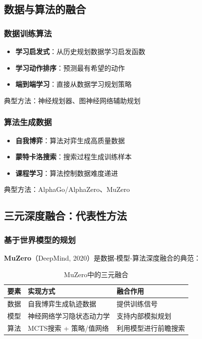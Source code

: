 \documentclass[12pt,a4paper]{ctexart}
\begin{document}
\subsection{数据与算法的融合}

\subsubsection{数据训练算法}

\begin{fusionbox}
\begin{itemize}
    \item \textbf{学习启发式}：从历史规划数据学习启发函数
    \item \textbf{学习动作排序}：预测最有希望的动作
    \item \textbf{端到端学习}：直接从数据学习规划策略
\end{itemize}
典型方法：神经规划器、图神经网络辅助规划
\end{fusionbox}

\subsubsection{算法生成数据}

\begin{fusionbox}
\begin{itemize}
    \item \textbf{自我博弈}：算法对弈生成高质量数据
    \item \textbf{蒙特卡洛搜索}：搜索过程生成训练样本
    \item \textbf{课程学习}：算法控制数据难度递进
\end{itemize}
典型方法：AlphaGo/AlphaZero、MuZero
\end{fusionbox}

\subsection{三元深度融合：代表性方法}

\subsubsection{基于世界模型的规划}

\textbf{MuZero}（DeepMind, 2020）是数据-模型-算法深度融合的典范：

\begin{table}[htbp]
\centering
\caption{MuZero中的三元融合}
\begin{tabular}{p{2cm}p{4cm}p{5cm}}
\toprule
\textbf{要素} & \textbf{实现方式} & \textbf{融合作用} \\
\midrule
数据 & 自我博弈生成轨迹数据 & 提供训练信号 \\
模型 & 神经网络学习隐状态动力学 & 支持内部模拟规划 \\
算法 & MCTS搜索 + 策略/值网络 & 利用模型进行前瞻搜索 \\
\bottomrule
\end{tabular}
\end{table}
\end{document}
